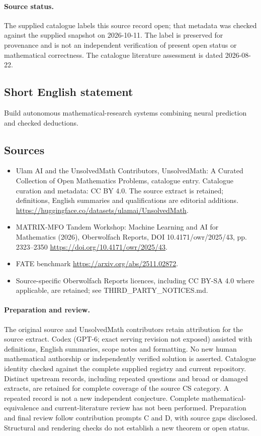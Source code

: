 \documentclass[11pt]{article}
\begin{document}
\paragraph{Source status.}
The supplied catalogue labels this source record open; that metadata was checked against the supplied snapshot on 2026-10-11. The label is preserved for provenance and is not an independent verification of present open status or mathematical correctness. The catalogue literature assessment is dated 2026-08-22.
\subsection{Short English statement}
Build autonomous mathematical-research systems combining neural prediction and checked deductions.
\subsection{Sources}
\begin{itemize}
\item[S1] Ulam AI and the UnsolvedMath Contributors, UnsolvedMath: A Curated Collection of Open Mathematics Problems, catalogue entry. Catalogue curation and metadata: CC BY 4.0. The source extract is retained; definitions, English summaries and qualifications are editorial additions.
\url{https://huggingface.co/datasets/ulamai/UnsolvedMath}.
\item[S2] MATRIX-MFO Tandem Workshop: Machine Learning and AI for Mathematics (2026), Oberwolfach Reports, DOI 10.4171/owr/2025/43, pp. 2323--2350
\url{https://doi.org/10.4171/owr/2025/43}.
\item[S3] FATE benchmark
\url{https://arxiv.org/abs/2511.02872}.
\item Source-specific Oberwolfach Reports licences, including CC BY-SA 4.0 where applicable, are retained; see THIRD\_PARTY\_NOTICES.md.
\end{itemize}
\paragraph{Preparation and review.}
The original source and UnsolvedMath contributors retain attribution for the source extract. Codex (GPT-6; exact serving revision not exposed) assisted with definitions, English summaries, scope notes and formatting. No new human mathematical authorship or independently verified solution is asserted. Catalogue identity checked against the complete supplied registry and current repository. Distinct upstream records, including repeated questions and broad or damaged extracts, are retained for complete coverage of the source CS category. A repeated record is not a new independent conjecture. Complete mathematical-equivalence and current-literature review has not been performed. Preparation and final review follow contribution prompts C and D, with source gaps disclosed. Structural and rendering checks do not establish a new theorem or open status.
\label{end:statement}
\end{document}
